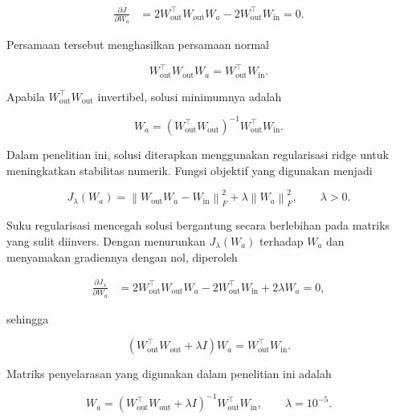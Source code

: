 \begin{align}
\frac{\partial J}{\partial W_a}
&=
2W_{\mathrm{out}}^\top W_{\mathrm{out}}W_a
-
2W_{\mathrm{out}}^\top W_{\mathrm{in}}
=
0.
\end{align}

Persamaan tersebut menghasilkan persamaan normal

\begin{equation}
W_{\mathrm{out}}^\top W_{\mathrm{out}}W_a
=
W_{\mathrm{out}}^\top W_{\mathrm{in}}.
\label{eq:raw-normal-equation}
\end{equation}

Apabila $W_{\mathrm{out}}^\top W_{\mathrm{out}}$ invertibel, solusi minimumnya adalah

\begin{equation}
W_a
=
\left(W_{\mathrm{out}}^\top W_{\mathrm{out}}\right)^{-1}
W_{\mathrm{out}}^\top W_{\mathrm{in}}.
\label{eq:raw-unregularized-solution}
\end{equation}

Dalam penelitian ini, solusi diterapkan menggunakan regularisasi ridge untuk meningkatkan stabilitas numerik. Fungsi objektif yang digunakan menjadi

\begin{equation}
J_\lambda(W_a)
=
\left\|
W_{\mathrm{out}}W_a-W_{\mathrm{in}}
\right\|_F^2
+
\lambda\left\|W_a\right\|_F^2,
\qquad \lambda>0.
\label{eq:raw-ridge-objective}
\end{equation}

Suku regularisasi mencegah solusi bergantung secara berlebihan pada matriks yang sulit diinvers. Dengan menurunkan $J_\lambda(W_a)$ terhadap $W_a$ dan menyamakan gradiennya dengan nol, diperoleh

\begin{align}
\frac{\partial J_\lambda}{\partial W_a}
&=
2W_{\mathrm{out}}^\top W_{\mathrm{out}}W_a
-
2W_{\mathrm{out}}^\top W_{\mathrm{in}}
+
2\lambda W_a
=
0,
\end{align}

sehingga

\begin{equation}
\left(
W_{\mathrm{out}}^\top W_{\mathrm{out}}+\lambda I
\right)W_a
=
W_{\mathrm{out}}^\top W_{\mathrm{in}}.
\label{eq:raw-ridge-normal-equation}
\end{equation}

Matriks penyelarasan yang digunakan dalam penelitian ini adalah

\begin{equation}
\boxed{
W_a
=
\left(
W_{\mathrm{out}}^\top W_{\mathrm{out}}+\lambda I
\right)^{-1}
W_{\mathrm{out}}^\top W_{\mathrm{in}}
},
\qquad \lambda=10^{-5}.
\label{eq:raw-alignment-matrix}
\end{equation}

